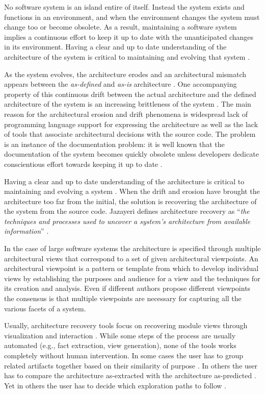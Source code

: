 \documentclass[preprint,12pt]{elsarticle}
\begin{document}
No software system is an island entire of itself. Instead the system exists and functions in an environment, and when the environment changes the system must change too or become obsolete\cite{lehman-softev}. As a result, maintaining a software system implies a continuous effort to keep it up to date with the unanticipated changes in its environment. Having a clear and up to date understanding of the architecture of the system is critical to maintaining and evolving that system \cite{Duca09c}.


As the system evolves, the architecture erodes \cite{perry-foundations} and an architectural mismatch appears between the {\em as-defined} and {\em as-is} architecture \cite{garlan-mismatch}.
One accompanying property of this continuous drift between the actual architecture and the defined architecture of the system is an increasing brittleness of the system \cite{perry-foundations}. The main reason for the architectural erosion and drift phenomena is widespread lack of programming language support for expressing the architecture as well as the lack of tools that associate architectural decisions with the source code. The problem is an instance of the documentation problem: it is well known that the documentation of the system becomes quickly obsolete unless developers dedicate conscientious effort towards keeping it up to date \cite{riva-report}.

Having a clear and up to date understanding of the architecture is critical to maintaining and evolving a system \cite{pollet-sar}. When the drift and erosion have brought the architecture too far from the initial, the solution is recovering the architecture of the system from the source code. Jazayeri defines architecture recovery as ``{\em the techniques and processes used to uncover a system’s architecture from available information}'' \cite{jaza-archevo}. 


In the case of large software systems the architecture is specified through multiple architectural views that correspond to a set of given architectural viewpoints. An architectural viewpoint is a pattern or template from which to develop individual views by establishing the purposes and audience for a view and the techniques for its creation and analysis. Even if different authors propose different viewpoints \cite{bass-architecture, kruchten-4plus, hof-apparch} the consensus is that multiple viewpoints are necessary for capturing all the various facets of a system.


Usually, architecture recovery tools focus on recovering module views through visualization and interaction \cite{murphy-reflexion, muller-rigi, storey-shrimp}. While some steps of the process are usually automated (e.g., fact extraction, view generation), none of the tools works completely without human intervention. In some cases the user has to group related artifacts together based on their similarity of purpose \cite{muller-rigi}. In others the user has to compare the architecture as-extracted with the architecture as-predicted \cite{murphy-reflexion}. Yet in others the user has to decide which exploration paths to follow \cite{storey-shrimp}.
\end{document}
